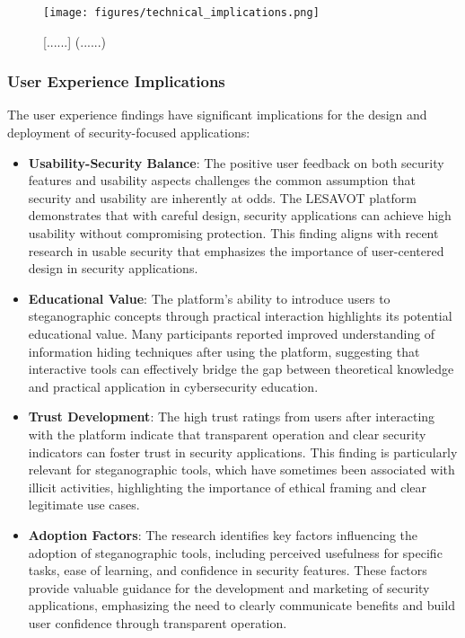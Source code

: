 \documentclass[12pt, a4paper, oneside]{book}
\begin{document}
\begin{figure}[htbp]
    \centering
    \texttt{[image: figures/technical\_implications.png]}
    \caption{[......] (......)}
    \label{fig:technical_implications}
\end{figure}

\subsubsection{User Experience Implications}

The user experience findings have significant implications for the design and deployment of security-focused applications:

\begin{itemize}[leftmargin=*]
    \item \textbf{Usability-Security Balance}: The positive user feedback on both security features and usability aspects challenges the common assumption that security and usability are inherently at odds. The LESAVOT platform demonstrates that with careful design, security applications can achieve high usability without compromising protection. This finding aligns with recent research in usable security that emphasizes the importance of user-centered design in security applications.

    \item \textbf{Educational Value}: The platform's ability to introduce users to steganographic concepts through practical interaction highlights its potential educational value. Many participants reported improved understanding of information hiding techniques after using the platform, suggesting that interactive tools can effectively bridge the gap between theoretical knowledge and practical application in cybersecurity education.

    \item \textbf{Trust Development}: The high trust ratings from users after interacting with the platform indicate that transparent operation and clear security indicators can foster trust in security applications. This finding is particularly relevant for steganographic tools, which have sometimes been associated with illicit activities, highlighting the importance of ethical framing and clear legitimate use cases.

    \item \textbf{Adoption Factors}: The research identifies key factors influencing the adoption of steganographic tools, including perceived usefulness for specific tasks, ease of learning, and confidence in security features. These factors provide valuable guidance for the development and marketing of security applications, emphasizing the need to clearly communicate benefits and build user confidence through transparent operation.


\end{itemize}
\end{document}
